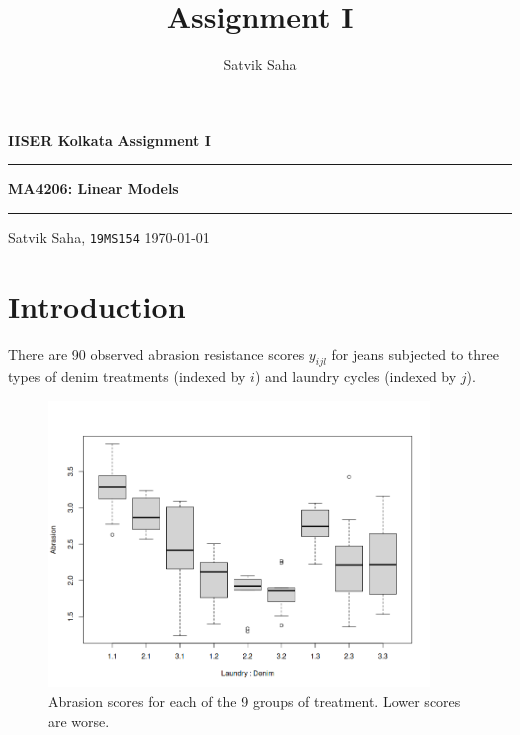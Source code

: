 \documentclass[10pt]{article}
\title{Assignment I}
\author{Satvik Saha}
\date{}
\begin{document}
    \noindent\textbf{IISER Kolkata} \hfill \textbf{Assignment I}
    \vspace{3pt}
    \hrule
    \vspace{3pt}
    \begin{center}
    \LARGE{\textbf{MA4206: Linear Models}}
    \end{center}
    \vspace{3pt}
    \hrule
    \vspace{3pt}
    Satvik Saha, \texttt{19MS154} \hfill \today
    \vspace{20pt}

    \setlength{\parskip}{1em}


    \section{Introduction}

    There are 90 observed abrasion resistance scores $y_{ijl}$ for jeans subjected to
    three types of denim treatments (indexed by $i$) and laundry cycles (indexed by
    $j$).

    \begin{figure}[H]
    \begin{center}
        \includegraphics[width=0.9\textwidth]{boxplot.png}
    \end{center}
    \caption{
        Abrasion scores for each of the 9 groups of treatment. Lower scores are
        worse.
    }
    \label{fig:boxplot}
    \end{figure}
\end{document}
